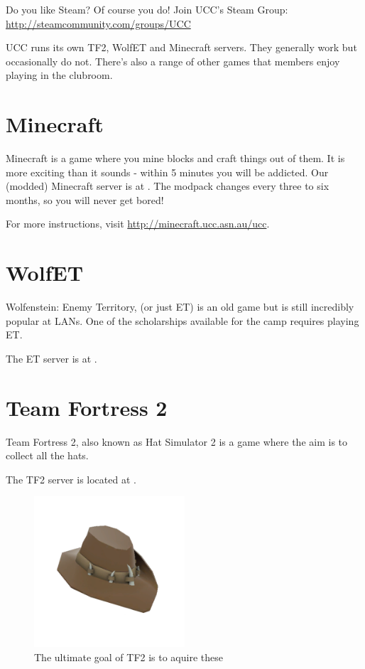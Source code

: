 \label{Games}

Do you like Steam? Of course you do! Join UCC's Steam Group: \url{http://steamcommunity.com/groups/UCC}

\noindent UCC runs its own TF2, WolfET and Minecraft servers. They generally work but occasionally do not.
There's also a range of other games that members enjoy playing in the clubroom.

\section{Minecraft}
Minecraft is a game where you mine blocks and craft things out of them. It is more exciting than it sounds - within 5 minutes you will be addicted.
Our (modded) Minecraft server is at . The modpack changes every three to six months, so you will never get bored!

For more instructions, visit \url{http://minecraft.ucc.asn.au/ucc}.

\section{WolfET}
Wolfenstein: Enemy Territory, (or just ET) is an old game but is still incredibly popular at LANs. One of the scholarships  available for the camp requires playing ET.

The ET server is at .

\section{Team Fortress 2}
Team Fortress 2, also known as Hat Simulator 2 is a game where the aim is to collect all the hats.

The TF2 server is located at .

\begin{figure}[H]
	\centering
	\includegraphics[width=0.5\textwidth]{figures/tf2_hat.png}
	\caption{The ultimate goal of TF2 is to aquire these}
	\label{tf2_hat.png}
\end{figure}
\fi

